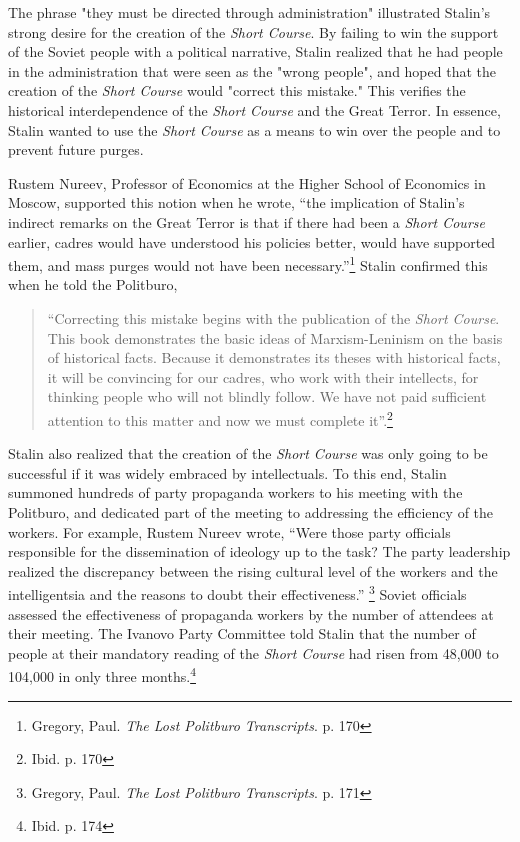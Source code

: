 \documentclass[a4paper, twocolumn]{article}
\begin{document}
The phrase "they must be directed through administration" illustrated
Stalin's strong desire for the creation of the \emph{Short Course}. By
failing to win the support of the Soviet people with a political
narrative, Stalin realized that he had people in the administration
that were seen as the "wrong people", and hoped that the creation of
the \emph{Short Course} would "correct this mistake." This verifies the
historical interdependence of the \emph{Short Course} and the Great
Terror. In essence, Stalin wanted to use the \emph{Short Course} as a means
to win over the people and to prevent future purges.

Rustem Nureev, Professor of Economics at the Higher School of
Economics in Moscow, supported this notion when he wrote, ``the
implication of Stalin's indirect remarks on the Great Terror is that
if there had been a \emph{Short Course} earlier, cadres would have understood
his policies better, would have supported them, and mass purges would
not have been necessary.''\footnote{Gregory, Paul. \emph{The Lost Politburo Transcripts}. p. 170} Stalin confirmed this when he told the
Politburo,

\begin{quote}
``Correcting this mistake begins with the publication of the \emph{Short
Course}. This book demonstrates the basic ideas of Marxism-Leninism on
the basis of historical facts. Because it demonstrates its theses with
historical facts, it will be convincing for our cadres, who work with
their intellects, for thinking people who will not blindly follow. We
have not paid sufficient attention to this matter and now we must
complete it''.\footnote{Ibid. p. 170}
\end{quote}


Stalin also realized that the creation of the \emph{Short Course} was only
going to be successful if it was widely embraced by
intellectuals. To this end, Stalin summoned hundreds of party
propaganda workers to his meeting with the Politburo, and dedicated
part of the meeting to addressing the efficiency of the workers. For example, Rustem Nureev wrote, ``Were those party officials responsible
for the dissemination of ideology up to the task? The party leadership
realized the discrepancy between the rising cultural level of the
workers and the intelligentsia and the reasons to doubt their
effectiveness.'' \footnote{Gregory, Paul. \emph{The Lost Politburo Transcripts}. p. 171} Soviet officials assessed the effectiveness of
propaganda workers by the number of attendees at their meeting. The
Ivanovo Party Committee told Stalin that the number of people at their mandatory
reading of the \emph{Short Course} had risen from 48,000 to 104,000 in only three months.\footnote{Ibid. p. 174}
\end{document}
